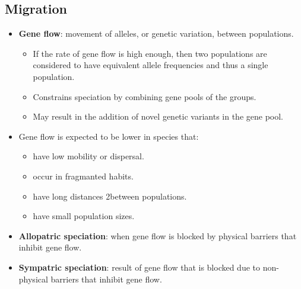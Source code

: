 \documentclass[12pt,a4paper]{article}
\begin{document}
\subsection{Migration}
\begin{itemize}
    \item \textbf{Gene flow}: movement of alleles, or genetic variation, between populations.
        \begin{itemize}
            \item If the rate of gene flow is high enough, then two populations are considered to have equivalent allele frequencies and thus a single population.
            \item Constrains speciation by combining gene pools of the groups.
            \item May result in the addition of novel genetic variants in the gene pool.
        \end{itemize}
        \item Gene flow is expected to be lower in species that:
            \begin{itemize}
                \item have low mobility or dispersal.
                \item occur in fragmanted habits.
                \item have long distances 2between populations.
                \item have small population sizes.
            \end{itemize}
        \item \textbf{Allopatric speciation}: when gene flow is blocked by {\color{o-Sun}physical} barriers that inhibit gene flow.
        \item \textbf{Sympatric speciation}: result of gene flow that is blocked due to {\color{o-Sun}non-physical} barriers that inhibit gene flow.
\end{itemize}
\end{document}
